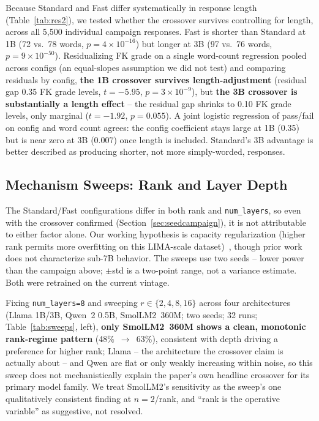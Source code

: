 \documentclass[pdflatex,sn-mathphys-num]{sn-jnl-official}%
\begin{document}
Because Standard and Fast differ systematically in response length (Table~\ref{tab:res2}), we tested whether the crossover survives controlling for length, across all 5{,}500 individual campaign responses. Fast is shorter than Standard at 1B (72 vs.\ 78 words, $p=4\times10^{-16}$) but longer at 3B (97 vs.\ 76 words, $p=9\times10^{-50}$). Residualizing FK grade on a single word-count regression pooled across configs (an equal-slopes assumption we did not test) and comparing residuals by config, \textbf{the 1B crossover survives length-adjustment} (residual gap 0.35 FK grade levels, $t=-5.95$, $p=3\times10^{-9}$), but \textbf{the 3B crossover is substantially a length effect} -- the residual gap shrinks to 0.10 FK grade levels, only marginal ($t=-1.92$, $p=0.055$). A joint logistic regression of pass/fail on config and word count agrees: the config coefficient stays large at 1B (0.35) but is near zero at 3B (0.007) once length is included. Standard's 3B advantage is better described as producing shorter, not more simply-worded, responses.

\subsection{Mechanism Sweeps: Rank and Layer Depth}\label{sec:ranksweep}

The Standard/Fast configurations differ in both rank and \texttt{num\_layers}, so even with the crossover confirmed (Section~\ref{sec:seedcampaign}), it is not attributable to either factor alone. Our working hypothesis is capacity regularization (higher rank permits more overfitting on this LIMA-scale dataset)~\cite{biderman2024lora,hu2022lora}, though prior work does not characterize sub-7B behavior. The sweeps use two seeds -- lower power than the campaign above; $\pm$std is a two-point range, not a variance estimate. Both were retrained on the current vintage.

Fixing \texttt{num\_layers=8} and sweeping $r \in \{2,4,8,16\}$ across four architectures (Llama 1B/3B, Qwen~2 0.5B, SmolLM2~360M; two seeds; 32 runs; Table~\ref{tab:sweeps}, left), \textbf{only SmolLM2~360M shows a clean, monotonic rank-regime pattern} (48\%~$\to$~63\%), consistent with depth driving a preference for higher rank; Llama -- the architecture the crossover claim is actually about -- and Qwen are flat or only weakly increasing within noise, so this sweep does not mechanistically explain the paper's own headline crossover for its primary model family. We treat SmolLM2's sensitivity as the sweep's one qualitatively consistent finding at $n=2$/rank, and ``rank is the operative variable'' as suggestive, not resolved.
\end{document}
